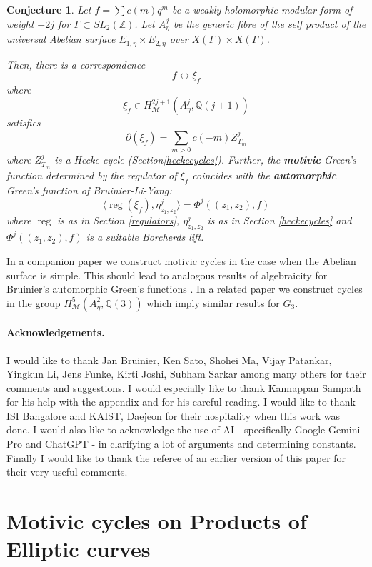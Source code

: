 \documentclass[11pt,a4paper]{article}
\newtheorem {conj}[defn]{Conjecture}
\newcommand {\ZZ}{{\mathds Z}}
\newcommand {\Q}{{\mathds Q}}
\newcommand {\M}{{\mathcal M}}
\def\reg{\operatorname{reg}}
\begin{document}
\begin{conj}
	Let $f=\sum c(m)q^m$ be a weakly holomorphic modular form of weight $-2j$ for $\Gamma \subset SL_2(\ZZ)$. Let $A^j_{\eta}$ be the generic fibre of the self product of the universal Abelian surface $E_{1,\eta} \times E_{2,\eta}$ over $X(\Gamma) \times X(\Gamma)$. 
	
	
	Then, there is a correspondence 
	$$f \leftrightarrow \xi_f$$ 
	where 
	$$\xi_f \in  H^{2j+1}_{\M}(A^{j}_{\eta},\Q(j+1))$$
	satisfies 
	$$\partial(\xi_f)=\sum_{m>0} c(-m) Z^j_{T_m}$$ 
	where $Z^j_{T_m}$ is a Hecke cycle (Section\ref{heckecycles}). Further, the {\bf motivic} Green's function determined by the regulator of $\xi_f$ coincides with the {\bf automorphic} Green's function of Bruinier-Li-Yang: 	
	$$\langle \reg(\xi_f),\eta^j_{z_1,z_2}\rangle=\Phi^j((z_1,z_2),f)$$
	where $\reg$ is as in Section \ref{regulators}, $\eta^j_{z_1,z_2}$ is  as in Section \ref{heckecycles} and $\Phi^j((z_1,z_2),f)$ is a suitable  Borcherds lift.  
\end{conj}


In a companion paper \cite{sree-simple} we construct motivic cycles  in the case when the Abelian surface is simple. This should lead to analogous results of algebraicity for Bruinier's automorphic Green's  functions \cite{brui}. In a related paper \cite{sree-products} we construct cycles in the group $H^5_{\M}(A^2_{\eta},\Q(3))$ which imply similar results for $G_3$. 

\subsection *{Acknowledgements.} 

I would like to thank Jan Bruinier, Ken Sato, Shohei Ma, Vijay Patankar, Yingkun Li, Jens Funke, Kirti Joshi, Subham Sarkar among many others for their comments and suggestions. I would especially like to thank Kannappan Sampath for his help with the appendix and for his careful reading. I would like to thank ISI Bangalore and KAIST, Daejeon for their hospitality when this work was done. I would also like to acknowledge the use of AI - specifically Google Gemini Pro and ChatGPT - in clarifying a lot of arguments and determining constants. Finally I would like to thank the referee of an earlier version of this paper for their very useful comments. 


\part{Motivic cycles on Products of Elliptic curves}
\end{document}
